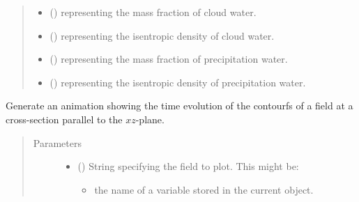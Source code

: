 \documentclass[letterpaper,10pt,english]{sphinxmanual}
\begin{document}
\begin{fulllineitems}
\begin{fulllineitems}
\begin{quote}
\begin{description}
\begin{itemize}
\item {} 
 () \textendash{}  representing the mass fraction of cloud water.

\item {} 
 () \textendash{}  representing the isentropic density of cloud water.

\item {} 
 () \textendash{}  representing the mass fraction of precipitation water.

\item {} 
 () \textendash{}  representing the isentropic density of precipitation water.

\end{itemize}

\end{description}\end{quote}

\end{fulllineitems}


\begin{fulllineitems}
\label{\detokenize{api:storages.state_isentropic.StateIsentropic.animation_contourf_xz}}
Generate an animation showing the time evolution of the contourfs of a field at a cross-section
parallel to the \(xz\)-plane.
\begin{quote}\begin{description}
\item[{Parameters}] \leavevmode\begin{itemize}
\item {} 
 () \textendash{} 
String specifying the field to plot. This might be:
\begin{itemize}
\item {} 
the name of a variable stored in the current object.


\end{itemize}
\end{itemize}
\end{description}
\end{quote}
\end{fulllineitems}
\end{fulllineitems}
\end{document}
